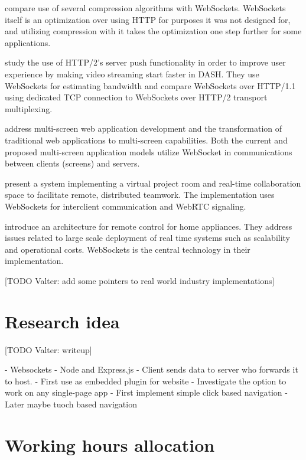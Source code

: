 \documentclass[12pt,a4paper,english,oneside]{article}
\begin{document}
\citet{compression} compare use of several compression algorithms with
WebSockets. WebSockets itself is an optimization over using HTTP for
purposes it was not designed for, and utilizing compression with it
takes the optimization one step further for some applications.

\citet{http2} study the use of HTTP/2's server push functionality in
order to improve user experience by making video streaming start
faster in DASH. They use WebSockets for estimating bandwidth and
compare WebSockets over HTTP/1.1 using dedicated TCP connection to
WebSockets over HTTP/2 transport multiplexing.

\citet{bassbouss} address multi-screen web application development and
the transformation of traditional web applications to multi-screen
capabilities. Both the current and proposed multi-screen application
models utilize WebSocket in communications between clients (screens)
and servers.

\citet{projectrooms} present a system implementing a virtual project
room and real-time collaboration space to facilitate remote,
distributed teamwork. The implementation uses WebSockets for
interclient communication and WebRTC signaling.

\citet{homeappliances} introduce an architecture for remote control for
home appliances. They address issues related to large scale deployment
of real time systems such as scalability and operational
costs. WebSockets is the central technology in their implementation.

[TODO Valter: add some pointers to real world industry implementations]

\section{Research idea}

[TODO Valter: writeup]

- Websockets
- Node and Express.js
- Client sends data to server who forwards it to host.
- First use as embedded plugin for website
- Investigate the option to work on any single-page app
- First implement simple click based navigation
- Later maybe tuoch based navigation


\section{Working hours allocation}
\end{document}
